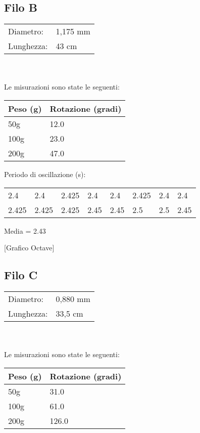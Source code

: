 \documentclass[a4paper,10pt]{report}
\begin{document}
\subsection{Filo B}
\begin{tabular}{ll}
Diametro:  & 1,175 mm \\
Lunghezza: & 43 cm \\

\end{tabular}
\\ \\
Le misurazioni sono state le seguenti:
\begin{center}
\begin{tabular}{|l|l|}
\toprule
Peso (g) & Rotazione (gradi)\\
\midrule
50g & 12.0 \\
100g & 23.0 \\
200g & 47.0 \\
\bottomrule
\end{tabular}
\end{center}
Periodo di oscillazione (s):
\\
\begin{center}
\begin{tabular}{llllllll}
2.4   & 2.4   & 2.425 & 2.4  & 2.4   & 2.425 & 2.4  & 2.4 \\
2.425 & 2.425 & 2.425 & 2.45 & 2.45  & 2.5   & 2.5  & 2.45 \\
\end{tabular}
\end{center}
Media = 2.43

[Grafico Octave]

\subsection{Filo C}
\begin{tabular}{ll}
Diametro: & 0,880 mm \\
Lunghezza: & 33,5 cm \\
\end{tabular}
\\ \\Le misurazioni sono state le seguenti:
\begin{center}
\begin{tabular}{|l|l|}
\toprule
Peso (g) & Rotazione (gradi)\\
\midrule
50g & 31.0 \\
100g & 61.0 \\
200g & 126.0 \\
\bottomrule
\end{tabular}
\end{center}
\end{document}
